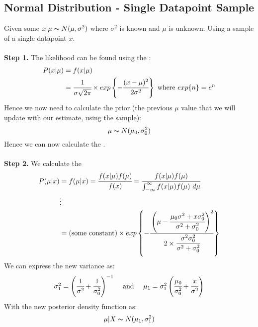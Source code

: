 \subsection{Normal Distribution - Single Datapoint Sample}
Given some $x|\mu \thicksim N(\mu, \sigma^2)$ where $\sigma^2$ is known and $\mu$ is unknown. Using a sample of a single datapoint $x$.
\\
\\ \textbf{Step 1.} The likelihood can be found using the :
\[\begin{split}
		P(x|\mu) &= f(x|\mu) \\
		&= \cfrac{1}{\sigma \sqrt{2 \pi}} \times exp \left\{ -\cfrac{(x - \mu)^2}{2 \sigma^2} \right\} \text{  where  $exp\{n\} = e^n$}\\
	\end{split}\]
Hence we now need to calculate the prior (the previous $\mu$ value that we will update with our estimate, using the sample):
\[\mu \thicksim N(\mu_0, \sigma^2_0)\]
Hence we can now calculate the .
\\
\\ \textbf{Step 2.} We calculate the 
\[\begin{split}
		P(\mu|x) &= f(\mu|x) = \cfrac{f(x|\mu)f(\mu)}{f(x)} = \cfrac{f(x|\mu)f(\mu)}{\int_{-\infty}^\infty f(x|\mu)f(\mu) \ d \mu} \\
		& \vdots \\
		&= \text{(some constant)} \times exp\left\{ -\cfrac{\left( \mu - \cfrac{\mu_0\sigma^2 + x \sigma_0^2}{\sigma^2 + \sigma_0^2} \right)^2}{2 \times \cfrac{\sigma^2\sigma_0^2}{\sigma^2 + \sigma_0^2}} \right\} \\
	\end{split}\]
We can express the new variance as:
\[\begin{matrix}
		\sigma^2_1 = \left( \cfrac{1}{\sigma^2} + \cfrac{1}{\sigma_0^2} \right)^{-1} & \text{  and  } & \mu_1 = \sigma_1^2 \left( \cfrac{\mu_0}{\sigma_0^2} + \cfrac{x}{\sigma^2} \right) \\
	\end{matrix}\]
With the new posterior density function as:
\[\mu|X \thicksim N(\mu_1, \sigma^2_1)\]
